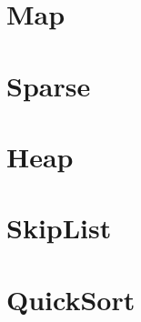 

\section{Map}



\section{Sparse}



\section{Heap}



\section{SkipList}



\section{QuickSort}


